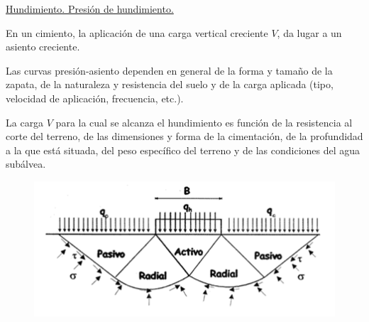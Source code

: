 \noindent \underline{Hundimiento. Presión de hundimiento.}

En un cimiento, la aplicación de una carga vertical creciente $V$, da lugar a un asiento creciente. 

Las curvas presión-asiento dependen en general de la forma y tamaño de la zapata, de la naturaleza y resistencia del suelo y de la carga aplicada (tipo, velocidad de aplicación, frecuencia, etc.). 

La carga $V$ para la cual se alcanza el hundimiento es función de la resistencia al corte del terreno, de las dimensiones y forma de la cimentación, de la profundidad a la que está situada, del peso específico del terreno y de las condiciones del agua subálvea.

\begin{figure}[H]
    \centering
    \includegraphics[width=1\linewidth]{Imagenes/Cimentaciones superficiales - estados limite ultimos.png}
\end{figure}

